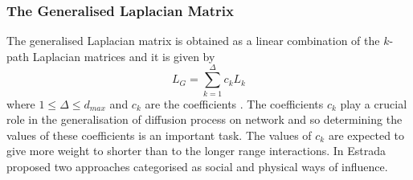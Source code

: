\documentclass[10pt,a4paper]{article}
\begin{document}
%    	    	
    	    \subsubsection{The Generalised Laplacian Matrix}
    	    The generalised Laplacian matrix is obtained as a linear combination of the $k$-path Laplacian matrices and it is given by
    	    \begin{equation}
    	    L_{G} = \sum_{k=1}^{\Delta} c_{k}L_{k}
    	    \end{equation}
			where $1 \leq \Delta \leq d_{max}$ and $c_k$ are the coefficients \citep{estrada2012path}.
		    The coefficients $c_k$ play a crucial role in the generalisation of diffusion process on network and so determining the values of these coefficients is an important task. The values of $c_k$ are expected to give more weight to shorter than to the longer range interactions. In \citep{estrada2012path} Estrada proposed two approaches categorised as social and physical ways of influence.
		    
\end{document}
